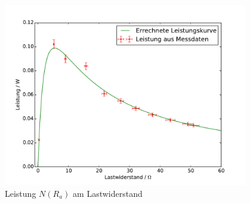 \begin{figure}[h!]
	\centering
	\includegraphics[width=0.95\textwidth]{Leistungskurve.pdf}
	\caption{Leistung $N(R_a)$ am Lastwiderstand}
	\label{fig:Werte_Leistung}
\end{figure}







